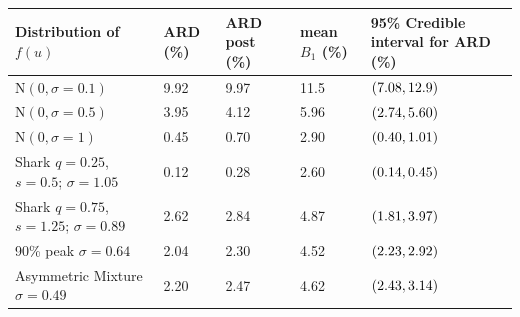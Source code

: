 \documentclass[aoas,preprint, 11pt, dvipsnames, table, x11name]{imsart}
\newcommand{\N}{\mbox{N}}
\theoremstyle{remark}
\begin{document}
	\begin{table}[t]
		\centering
		\begin{tabular}{lP{1.1cm}P{1.1cm}P{1.1cm}P{2.9cm}}
			\toprule
			Distribution of $f(u)$  & ARD (\%)&ARD post (\%)& mean $B_1$ (\%) &95\% Credible interval for ARD (\%)  \\ \midrule
			$\N(0,\sigma=0.1)$ &9.92&9.97&11.5&$\qty(7.08, 12.9)$\\ %
			$\N(0,\sigma=0.5)$ &3.95&4.12 &5.96 &$\qty(2.74, 5.60)$\\%
			$\N(0,\sigma=1)$&0.45&0.70&2.90&$\qty(0.40, 1.01)$\\
			Shark $q=0.25$, $s=0.5$; $\sigma=1.05$&0.12&0.28&2.60&$\qty(0.14, 0.45)$\\
			Shark $q=0.75$, $s=1.25$; $\sigma=0.89$&2.62&2.84&4.87&$\qty(1.81, 3.97)$\\
			90\% peak $\sigma=0.64$&2.04&2.30&4.52&$\qty(2.23, 2.92)$\\
					
			Asymmetric Mixture $\sigma=0.49$&2.20&2.47&4.62&$\qty(2.43, 3.14)$\\
			

\end{tabular}
\end{table}
\end{document}
